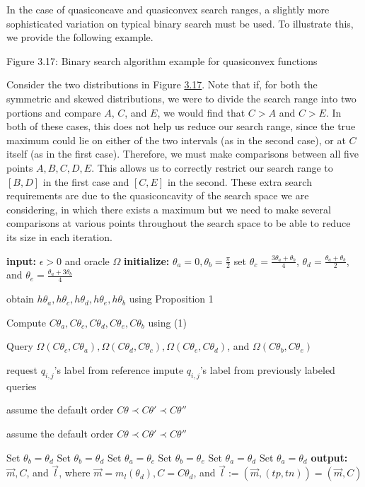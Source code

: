 \documentclass[
  letterpaper,
  numbers=noenddot,
  DIV=11,
  oneside]{scrreprt}
\theoremstyle{remark}
\begin{document}
In the case of quasiconcave and quasiconvex search ranges, a slightly
more sophisticated variation on typical binary search must be used. To
illustrate this, we provide the following example.

Figure 3.17: Binary search algorithm example for quasiconvex functions

Consider the two distributions in Figure \hyperref[bsearch]{3.17}. Note
that if, for both the symmetric and skewed distributions, we were to
divide the search range into two portions and compare \(A\), \(C\), and
\(E\), we would find that \(C>A\) and \(C>E\). In both of these cases,
this does not help us reduce our search range, since the true maximum
could lie on either of the two intervals (as in the second case), or at
\(C\) itself (as in the first case). Therefore, we must make comparisons
between all five points \(A, B, C, D, E\). This allows us to correctly
restrict our search range to \([B, D]\) in the first case and \([C, E]\)
in the second. These extra search requirements are due to the
quasiconcavity of the search space we are considering, in which there
exists a maximum but we need to make several comparisons at various
points throughout the search space to be able to reduce its size in each
iteration.

\textbf{input:} \(\epsilon > 0\) and oracle \(\Omega\)
\textbf{initialize:} \(\theta_a = 0, \theta_b = \frac{\pi}{2}\) set
\(\theta_c = \frac{3\theta_a+\theta_b}{4}\),
\(\theta_d = \frac{\theta_a+\theta_b}{2}\), and
\(\theta_e = \frac{\theta_a+3\theta_b}{4}\)

obtain \(h\theta_a, h\theta_c, h\theta_d, h\theta_e, h\theta_b\) using
Proposition 1

Compute \(C\theta_a, C\theta_c, C\theta_d, C\theta_e, C\theta_b\) using
(1)

Query
\(\Omega(C\theta_c, C\theta_a), \Omega(C\theta_d, C\theta_c), \Omega(C\theta_e, C\theta_d)\),
and \(\Omega(C\theta_b, C\theta_e)\)

request \(q_{i,j}\)'s label from reference impute \(q_{i,j}\)'s label
from previously labeled queries

assume the default order \(C\theta \prec C\theta' \prec C\theta''\)

assume the default order \(C\theta \prec C\theta' \prec C\theta''\)

Set \(\theta_b = \theta_d\) Set \(\theta_b = \theta_d\) Set
\(\theta_a = \theta_c\) Set \(\theta_b = \theta_e\) Set
\(\theta_a = \theta_d\) Set \(\theta_a = \theta_d\) \textbf{output:}
\(\vec{m}, C\), and \(\vec{l}\), where
\(\vec{m} = m_l(\theta_d), C = C\theta_d\), and
\(\vec{l} := (\vec{m}, (tp, tn)) = (\vec{m}, C)\)
\end{document}
